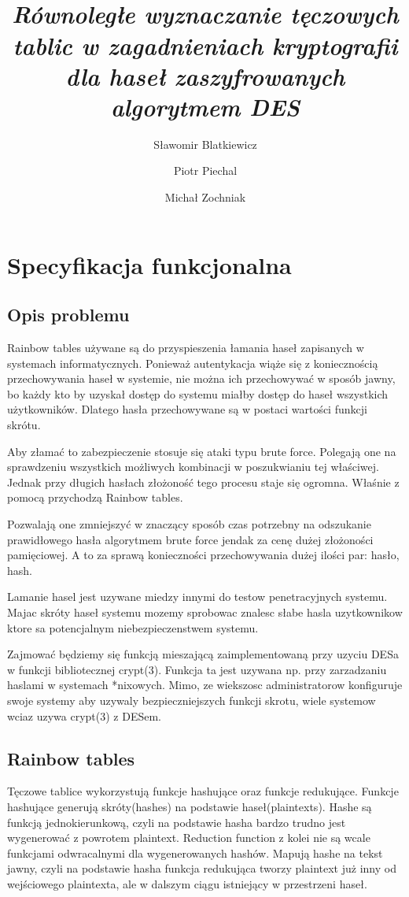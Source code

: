 \documentclass[a4paper,11pt]{article}
\title{ \sc{Programowanie Równoległe i Rozproszone} \\
\emph{Równoległe wyznaczanie tęczowych tablic w zagadnieniach kryptografii dla haseł zaszyfrowanych algorytmem DES} }
\author{Sławomir Blatkiewicz
\and Piotr Piechal
\and Michał Zochniak}
\begin{document}
\maketitle
\tableofcontents

\section{Specyfikacja funkcjonalna}

\subsection{Opis problemu}
Rainbow tables używane są do przyspieszenia łamania haseł zapisanych w systemach informatycznych. Ponieważ autentykacja wiąże się z koniecznością przechowywania haseł w systemie, nie można ich przechowywać w sposób jawny, bo każdy kto by uzyskał dostęp do systemu miałby dostęp do haseł wszystkich użytkowników. Dlatego hasła przechowywane są w postaci wartości funkcji skrótu.

Aby złamać to zabezpieczenie stosuje się ataki typu brute force. Polegają one na sprawdzeniu wszystkich możliwych kombinacji w poszukwianiu tej właściwej. Jednak przy długich hasłach złożoność tego procesu staje się ogromna. Właśnie z pomocą przychodzą Rainbow tables.

Pozwalają one zmniejszyć w znaczący sposób czas potrzebny na odszukanie prawidłowego hasła algorytmem brute force jendak za cenę dużej złożoności pamięciowej. A to za sprawą konieczności przechowywania dużej ilości par: hasło, hash.

Lamanie hasel jest uzywane miedzy innymi do testow penetracyjnych systemu. Majac skróty haseł systemu mozemy sprobowac znalesc słabe hasla uzytkownikow ktore sa potencjalnym niebezpieczenstwem systemu.

Zajmować będziemy się funkcją mieszającą zaimplementowaną przy uzyciu DESa w funkcji bibliotecznej crypt(3).
Funkcja ta jest uzywana np. przy zarzadzaniu haslami w systemach *nixowych. Mimo, ze wiekszosc administratorow konfiguruje swoje systemy aby uzywaly bezpieczniejszych funkcji skrotu, wiele systemow wciaz uzywa crypt(3) z DESem.


\subsection{Rainbow tables}
Tęczowe tablice wykorzystują funkcje hashujące oraz funkcje redukujące. Funkcje hashujące generują skróty(hashes) na podstawie haseł(plaintexts). Hashe są funkcją jednokierunkową, czyli na podstawie hasha bardzo trudno jest wygenerować z powrotem plaintext. Reduction function z kolei nie są wcale funkcjami odwracalnymi dla wygenerowanych hashów. Mapują hashe na tekst jawny, czyli na podstawie hasha funkcja redukująca tworzy plaintext już inny od wejściowego plaintexta, ale w dalszym ciągu istniejący w przestrzeni haseł. 
\end{document}
